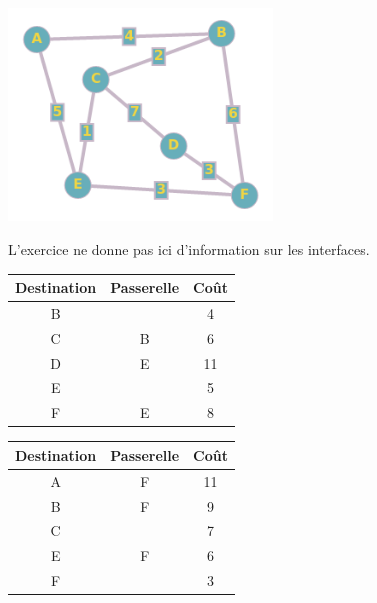 \documentclass[a4paper,11pt]{article}
\begin{document}
\begin{exo}
\begin{center}
\centering
\includegraphics[width=7cm]{ressources/exo2.png}
\label{IMG}
\end{center}
L'exercice ne donne pas ici d'information sur les interfaces.
\begin{center}
    \begin{tabular}{|*{3}{c|}}
        \hline
        Destination & Passerelle & Coût \\
        \hline
        B &  &  4 \\
        \hline
        C & B & 6 \\
        \hline
        D & E & 11 \\
        \hline
        E &   & 5 \\
        \hline
        F & E & 8 \\
        \hline
    \end{tabular}
\end{center}
\begin{center}
    \begin{tabular}{|*{3}{c|}}
        \hline
        Destination & Passerelle & Coût \\
        \hline
        A & F & 11 \\
        \hline
        B & F &  9 \\
        \hline
        C &  & 7 \\
        \hline
        E &  F & 6 \\
        \hline
        F &  & 3 \\
        \hline
    \end{tabular}
\end{center}
\end{exo}
\end{document}
